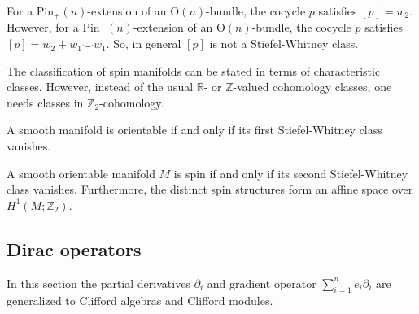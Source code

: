     \begin{property}
        For a $\mathrm{Pin}_+(n)$-extension of an $\mathrm{O}(n)$-bundle, the cocycle $p$ satisfies $[p]=w_2$. However, for a $\mathrm{Pin}_-(n)$-extension of an $\mathrm{O}(n)$-bundle, the cocycle $p$ satisfies $[p]=w_2+w_1\smile w_1$. So, in general $[p]$ is not a Stiefel-Whitney class.
    \end{property}

    The classification of spin manifolds can be stated in terms of characteristic classes. However, instead of the usual $\mathbb{R}$- or $\mathbb{Z}$-valued cohomology classes, one needs classes in $\mathbb{Z}_2$-cohomology.
    \begin{property}[Orientability]
        A smooth manifold is orientable if and only if its first Stiefel-Whitney class vanishes.
    \end{property}
    \begin{property}
        A smooth orientable manifold $M$ is spin if and only if its second Stiefel-Whitney class vanishes. Furthermore, the distinct spin structures form an affine space over $H^1(M;\mathbb{Z}_2)$.
    \end{property}

\subsection{Dirac operators}

    In this section the partial derivatives $\partial_i$ and gradient operator $\sum_{i=1}^ne_i\partial_i$ are generalized to Clifford algebras and Clifford modules.



